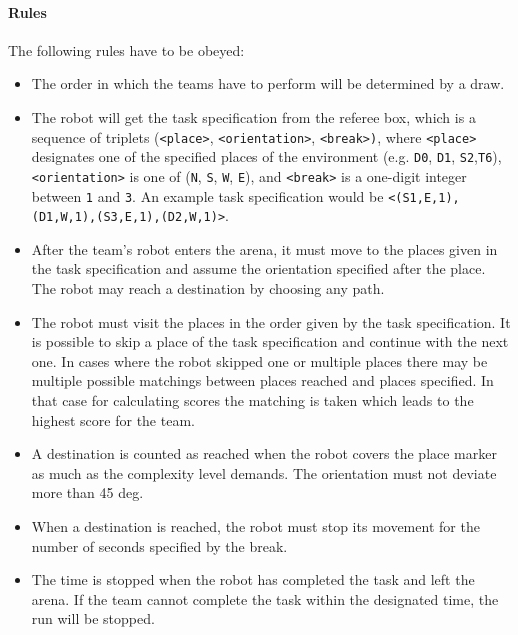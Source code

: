 \paragraph{Rules}
The following rules have to be obeyed:

\begin{itemize}
\item The order in which the teams have to perform will be determined by a draw.
\item The robot will get the task specification from the referee box, which is a sequence of triplets (\texttt{\textless place\textgreater}, \texttt{\textless orientation\textgreater}, \texttt{\textless break\textgreater)}, where \texttt{\textless place\textgreater} designates one of the specified places of the environment (e.g. \texttt{D0}, \texttt{D1}, \texttt{S2},\texttt{T6}), \texttt{\textless orientation\textgreater} is one of (\texttt{N}, \texttt{S}, \texttt{W}, \texttt{E}), and \texttt{\textless break\textgreater} is a one-digit integer between \texttt{1} and \texttt{3}. An example task specification would be \texttt{\textless (S1,E,1),(D1,W,1),(S3,E,1),(D2,W,1)\textgreater}.
\item After the team's robot enters the arena, it must move to the places given in the task specification and assume the orientation specified after the place. The robot may reach a destination by choosing any path.
\item The robot must visit the places in the order given by the task specification. It is possible to skip a place of the task specification and continue with the next one. In cases where the robot skipped one or multiple places there may be multiple possible matchings between places reached and places specified. In that case for calculating scores the matching is taken which leads to the highest score for the team.
\item A destination is counted as reached when the robot covers the place marker as much as the complexity level demands. The orientation must not deviate more than 45 deg.
\item When a destination is reached, the robot must stop its movement for the number of seconds specified by the break.
\item The time is stopped when the robot has completed the task and left the arena. If the team cannot complete the task within the designated time, the run will be stopped.
\end{itemize}
%
%
%
